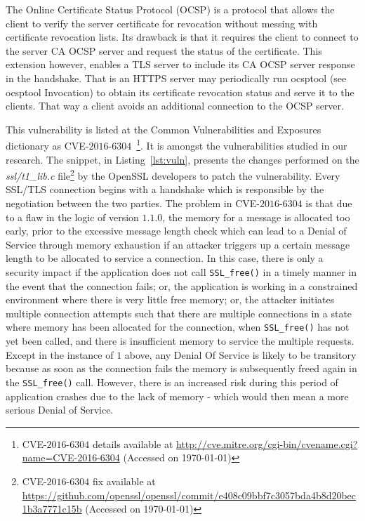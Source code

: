 \documentclass[10pt,conference]{IEEEtran}
\begin{document}
The Online Certificate Status Protocol (OCSP) is a protocol that allows the client to verify the server certificate for revocation without messing with certificate revocation lists. Its drawback is that it requires the client to connect to the server CA OCSP server and request the status of the certificate. This extension however, enables a TLS server to include its CA OCSP server response in the handshake. That is an HTTPS server may periodically run ocsptool (see ocsptool Invocation) to obtain its certificate revocation status and serve it to the clients. That way a client avoids an additional connection to the OCSP server.

This vulnerability is listed at the Common
Vulnerabilities and Exposures dictionary as CVE-$2016$-$6304$~\footnote{CVE-$2016$-$6304$
details available at \url{http://cve.mitre.org/cgi-bin/cvename.cgi?name=CVE-2016-6304}
(Accessed on \today{})}. It is amongst the vulnerabilities studied in our
research. The snippet, in Listing~\ref{lst:vuln}, presents the changes performed on the
\emph{ssl/t1\_lib.c} file\footnote{CVE-$2016$-$6304$ fix available  at
\url{https://github.com/openssl/openssl/commit/e408c09bbf7c3057bda4b8d20bec1b3a7771c15b}
(Accessed on \today{})} by the OpenSSL developers to patch the vulnerability. Every SSL/TLS connection begins with a handshake 
which is responsible by the negotiation between the two parties. The problem in
CVE-$2016$-$6304$ is that due to a flaw in the logic of version $1.1.0$,
the memory for a message is allocated too early, prior to the excessive
message length check which can lead to a Denial of Service through memory
exhaustion if an attacker triggers up a certain message length to be allocated to service a
connection. In this case, there is only a security impact if the application does not call  
\texttt{SSL\_free()} in a timely manner in the event that the connection fails;
or, the application is working in a constrained environment where there
is very little free memory;
or, the attacker initiates multiple connection attempts such that there
are multiple connections in a state where memory has been allocated for
the connection, when \texttt{SSL\_free()} has not yet been called, and there is
insufficient memory to service the multiple requests. Except in the instance of $1$ above, any Denial Of Service is likely to
be transitory because as soon as the connection fails the memory is
subsequently freed again in the \texttt{SSL\_free()} call. However, there is an
increased risk during this period of application crashes due to the lack
of memory - which would then mean a more serious Denial of Service.
\end{document}
